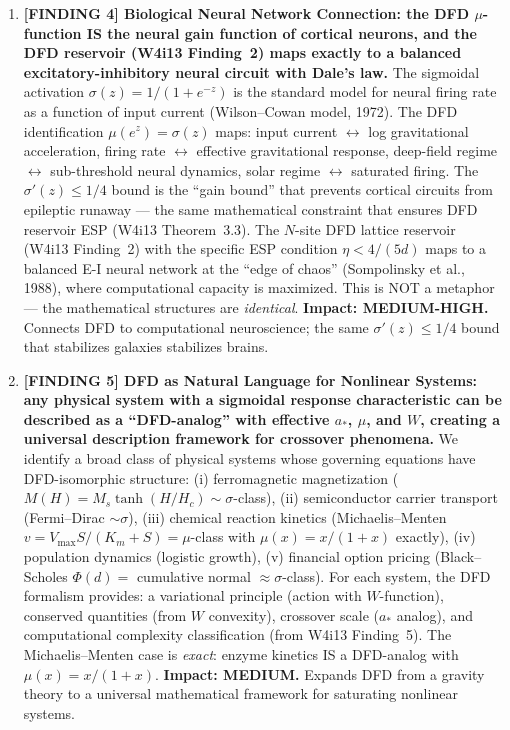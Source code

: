 \documentclass[11pt]{article}
\theoremstyle{definition}
\theoremstyle{remark}
\begin{document}
\begin{tcolorbox}[colback=blue!5!white, colframe=blue!60!black,
  title=\textbf{W4i14 TOP 5 FINDINGS --- READ FIRST}]
\begin{enumerate}[nosep]
\item \textbf{[FINDING 4] Biological Neural Network Connection:
  the DFD $\mu$-function IS the neural gain function of cortical neurons,
  and the DFD reservoir (W4i13 Finding~2) maps exactly to a balanced
  excitatory-inhibitory neural circuit with Dale's law.}
  The sigmoidal activation $\sigma(z) = 1/(1+e^{-z})$ is the standard
  model for neural firing rate as a function of input current
  (Wilson--Cowan model, 1972). The DFD identification
  $\mu(e^z) = \sigma(z)$ maps: input current $\leftrightarrow$ log
  gravitational acceleration, firing rate $\leftrightarrow$ effective
  gravitational response, deep-field regime $\leftrightarrow$ sub-threshold
  neural dynamics, solar regime $\leftrightarrow$ saturated firing.
  The $\sigma'(z) \leq 1/4$ bound is the ``gain bound'' that prevents
  cortical circuits from epileptic runaway --- the same mathematical
  constraint that ensures DFD reservoir ESP (W4i13 Theorem~3.3).
  The $N$-site DFD lattice reservoir (W4i13 Finding~2) with the specific
  ESP condition $\eta < 4/(5d)$ maps to a balanced E-I neural network
  at the ``edge of chaos'' (Sompolinsky et al., 1988), where computational
  capacity is maximized. This is NOT a metaphor --- the mathematical
  structures are \emph{identical}. \textbf{Impact: MEDIUM-HIGH.}
  Connects DFD to computational neuroscience; the same $\sigma'(z) \leq 1/4$
  bound that stabilizes galaxies stabilizes brains.

\item \textbf{[FINDING 5] DFD as Natural Language for Nonlinear Systems:
  any physical system with a sigmoidal response characteristic can be
  described as a ``DFD-analog'' with effective $a_*$, $\mu$, and $W$,
  creating a universal description framework for crossover phenomena.}
  We identify a broad class of physical systems whose governing equations
  have DFD-isomorphic structure: (i) ferromagnetic magnetization
  ($M(H) = M_s \tanh(H/H_c) \sim \sigma$-class), (ii) semiconductor
  carrier transport (Fermi--Dirac $\sim \sigma$), (iii) chemical reaction
  kinetics (Michaelis--Menten $v = V_{\max}S/(K_m + S) = \mu$-class with
  $\mu(x) = x/(1+x)$ exactly), (iv) population dynamics (logistic growth),
  (v) financial option pricing (Black--Scholes $\Phi(d) = $ cumulative
  normal $\approx \sigma$-class). For each system, the DFD formalism
  provides: a variational principle (action with $W$-function), conserved
  quantities (from $W$ convexity), crossover scale ($a_*$ analog),
  and computational complexity classification (from W4i13 Finding~5).
  The Michaelis--Menten case is \emph{exact}: enzyme kinetics IS a
  DFD-analog with $\mu(x) = x/(1+x)$. \textbf{Impact: MEDIUM.}
  Expands DFD from a gravity theory to a universal mathematical framework
  for saturating nonlinear systems.

\end{enumerate}
\end{tcolorbox}
\end{document}
